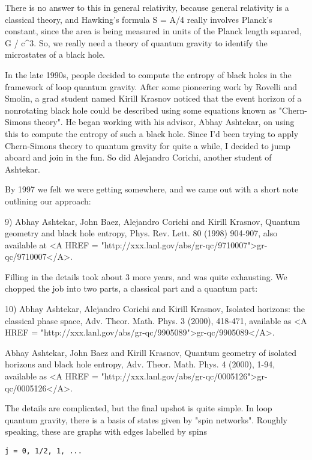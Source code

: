 There is no answer to this in general relativity, because general
relativity is a classical theory, and Hawking's formula S = A/4 really
involves Planck's constant, since the area is being measured in units of
the Planck length squared, \hbar  G / c^{3}.  
So, we really need a theory of
quantum gravity to identify the microstates of a black hole.

In the late 1990s, people decided to compute the entropy of black holes
in the framework of loop quantum gravity.  After some pioneering work
by Rovelli and Smolin, a grad student named Kirill Krasnov noticed that
the event horizon of a nonrotating black hole could be described using
some equations known as "Chern-Simons theory".  He began working with
his advisor, Abhay Ashtekar, on using this to compute the entropy of
such a black hole.  Since I'd been trying to apply Chern-Simons theory
to quantum gravity for quite a while, I decided to jump aboard and join
in the fun.  So did Alejandro Corichi, another student of Ashtekar.

By 1997 we felt we were getting somewhere, and we came out with a short
note outlining our approach:

9) Abhay Ashtekar, John Baez, Alejandro Corichi and Kirill Krasnov,
Quantum geometry and black hole entropy, Phys. Rev. Lett. 80 (1998) 
904-907, also available at <A HREF = "http://xxx.lanl.gov/abs/gr-qc/9710007">gr-qc/9710007</A>.  

Filling in the details took about 3 more years, and was quite
exhausting.  We chopped the job into two parts, a classical part 
and a quantum part:

10) Abhay Ashtekar, Alejandro Corichi and Kirill Krasnov, Isolated
horizons: the classical phase space, Adv. Theor.  Math. Phys. 3 (2000),
418-471, available as <A HREF = "http://xxx.lanl.gov/abs/gr-qc/9905089">gr-qc/9905089</A>.

Abhay Ashtekar, John Baez and Kirill Krasnov, Quantum geometry of
isolated horizons and black hole entropy, Adv. Theor. Math. Phys. 4
(2000), 1-94, available as <A HREF = "http://xxx.lanl.gov/abs/gr-qc/0005126">gr-qc/0005126</A>.

The details are complicated, but the final upshot is quite simple.  
In loop quantum gravity, there is a basis of states given by "spin
networks".  Roughly speaking, these are graphs with edges labelled by
spins

\begin{verbatim}
j = 0, 1/2, 1, ...
\end{verbatim}
    
